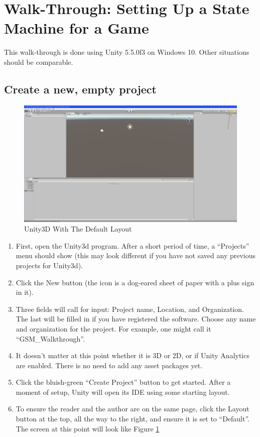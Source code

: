 \documentclass[letter,12pt]{article}
\begin{document}
\section{Walk-Through: Setting Up a State Machine for a Game}

This walk-through is done using Unity 5.5.0f3 on Windows 10.  Other situations should be comparable.

\subsection{Create a new, empty project}

\begin{figure}
 \includegraphics[width=6in]{layout.png}
 \caption{Unity3D With The Default Layout}
 \label{fig:layout}
\end{figure}


\begin{enumerate}

\item First, open the Unity3d program.  After a short period of time, a “Projects” menu should show (this may look different if you have not saved any previous projects for Unity3d).

\item Click the New button (the icon is a dog-eared sheet of paper with a plus sign in it).

\item Three fields will call for input: Project name, Location, and Organization.  The last will be filled in if you have registered the software.  Choose any name and organization for the project.  For example, one might call it “GSM\_Walkthrough”.  

\item It doesn’t matter at this point whether it is 3D or 2D, or if Unity Analytics are enabled.  There is no need to add any asset packages yet.

\item Click the bluish-green “Create Project” button to get started.  After a moment of setup, Unity will open its IDE using some starting layout. 

\item To ensure the reader and the author are on the same page, click the Layout button at the top, all the way to the right, and ensure it is set to “Default”.  The screen at this point will look like Figure \ref{fig:layout} 

\end{enumerate}
\end{document}

